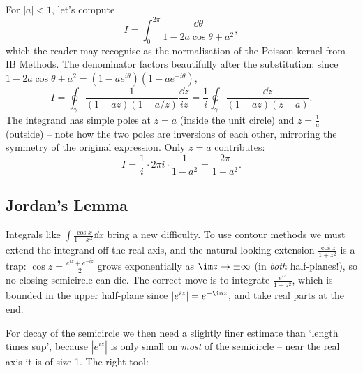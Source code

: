 \begin{example}
	For $|a| < 1$, let's compute
	$$
	I = \int_0^{2\pi} \frac{\dd \theta}{1 - 2a\cos\theta + a^2},
	$$
	which the reader may recognise as the normalisation of the Poisson kernel from IB Methods. The denominator factors beautifully after the substitution: since $1 - 2a\cos\theta + a^2 = (1 - ae^{i\theta})(1 - ae^{-i\theta})$,
	$$
	I = \oint_\gamma \frac{1}{(1 - az)(1 - a/z)} \frac{\dd z}{iz} = \frac 1i \oint_\gamma \frac{\dd z}{(1 - az)(z - a)}.
	$$
	The integrand has simple poles at $z = a$ (inside the unit circle) and $z = \frac 1a$ (outside) -- note how the two poles are inversions of each other, mirroring the symmetry of the original expression. Only $z = a$ contributes:
	$$
	I = \frac 1i \cdot 2\pi i \cdot \frac{1}{1 - a^2} = \frac{2\pi}{1 - a^2}.
	$$
\end{example}

\subsection{Jordan's Lemma}

Integrals like $\int \frac{\cos x}{1 + x^2} \dd x$ bring a new difficulty. To use contour methods we must extend the integrand off the real axis, and the natural-looking extension $\frac{\cos z}{1 + z^2}$ is a trap: $\cos z = \frac{e^{iz} + e^{-iz}}{2}$ grows exponentially as $\im z \to \pm\infty$ (in \emph{both} half-planes!), so no closing semicircle can die. The correct move is to integrate $\frac{e^{iz}}{1 + z^2}$, which is bounded in the upper half-plane since $|e^{iz}| = e^{-\im z}$, and take real parts at the end.

For decay of the semicircle we then need a slightly finer estimate than `length times sup', because $|e^{iz}|$ is only small on \emph{most} of the semicircle -- near the real axis it is of size 1. The right tool:

